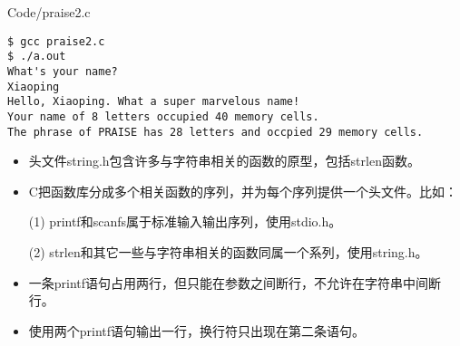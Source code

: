 \begin{frame}

    {
      Code/praise2.c
    }
\end{frame}


\begin{frame}[fragile]

\begin{lstlisting}[backgroundcolor=\color{red!10}]
$ gcc praise2.c
$ ./a.out
What's your name?
Xiaoping
Hello, Xiaoping. What a super marvelous name!
Your name of 8 letters occupied 40 memory cells.
The phrase of PRAISE has 28 letters and occpied 29 memory cells.
\end{lstlisting}
\end{frame}

\begin{frame}[fragile]
\begin{itemize}
\item \tf 头文件string.h包含许多与字符串相关的函数的原型，包括strlen函数。\\[0.1in]
\item C把函数库分成多个相关函数的序列，并为每个序列提供一个头文件。比如：\\[0.1in]
\item[(1)] printf和scanfs属于标准输入输出序列，使用stdio.h。\\[0.1in]
\item[(2)] strlen和其它一些与字符串相关的函数同属一个系列，使用string.h。
\end{itemize}
\end{frame}

\begin{frame}[fragile]
\begin{itemize}
\item 一条printf语句占用两行，但只能在参数之间断行，不允许在字符串中间断行。\\[0.1in]
\item 使用两个printf语句输出一行，换行符只出现在第二条语句。
\end{itemize}
\end{frame}

